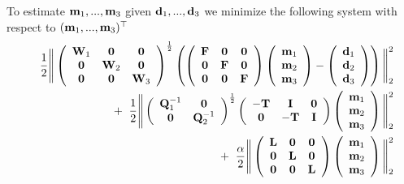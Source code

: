\documentclass[11pt]{article}
\newcommand{\bfF}	{{\bf{F}}}
\newcommand{\bfI}	{{\bf{I}}}
\newcommand{\bfL}	{{\bf{L}}}
\newcommand{\bfQ}	{{\bf{Q}}}
\newcommand{\bfT}	{{\bf{T}}}
\newcommand{\bfW}	{{\bf{W}}}
\newcommand{\bfd}	{{\bf{d}}}
\newcommand{\bfm}	{{\bf{m}}}
\newcommand{\hf}        {{\frac 12}}
\newcommand {\zero}  { {\bf 0} }
\renewcommand{\hf}		 {\frac12}
\begin{document}
{To estimate $\bfm_1,...,\bfm_3$ given $\bfd_1,...,\bfd_3$ we minimize the following system with respect to $(\bfm_1,..., \bfm_3)^{\top}$
\begin{eqnarray}
\nonumber
&&\hf\Bigg\|
\left(\begin{array}{ccc}\bfW_1 & \zero & \zero \\ \zero & \bfW_2 & \zero \\ \zero & \zero & \bfW_3 \end{array}\right)^{\hf}	
\left(
\left(\begin{array}{ccc}\bfF & \zero & \zero \\   \zero & \bfF & \zero\\\zero & \zero& \bfF \end{array}\right)	
\left(\begin{array}{c}  \bfm_1  \\ \bfm_2 \\ \bfm_3\end{array}\right) -
\left(\begin{array}{c} \bfd_1   \\ \bfd_2 \\ \bfd_3\end{array}\right)
\right)\Bigg\|^2_2\\
 &&+ \;\;
\hf\Bigg\|
\left(\begin{array}{cc}\bfQ^{-1}_1 & \zero \\ \zero& \bfQ^{-1}_2 \end{array}\right)^{\hf}
\left( \begin{array}{ccc} -\bfT & \bfI & \zero  \\ \zero & -\bfT & \bfI \end{array}\right)
\left(\begin{array}{c}  \bfm_1  \\ \bfm_2 \\ \bfm_3 \end{array}\right)\Bigg\|^2_2\\
&&+ \;\;
\frac{\alpha}{2}\Bigg\|
\left(\begin{array}{ccc}\bfL & \zero & \zero \\ \zero & \bfL & \zero \\ \zero & \zero & \bfL \end{array}\right)\left(\begin{array}{c}  \bfm_1  \\ \bfm_2 \\ \bfm_3 \end{array}\right)\Bigg\|^2_2
\end{eqnarray}
}
\end{document}
